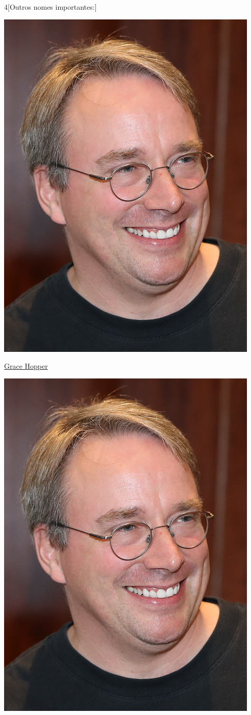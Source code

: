 \begin{multicols}{4}[Outros nomes importantes:]
\begin{center}
					\includegraphics[width=.8\columnwidth]{./IMG-GIT/CIENTISTAS/linus.jpeg}
\end{center}
				
\vfill\null
\columnbreak				
				
				\href{https://pt.wikipedia.org/wiki/Grace_Hopper}{Grace Hopper}
				
\begin{center}
					\includegraphics[width=.8\columnwidth]{./IMG-GIT/CIENTISTAS/linus.jpeg}
\end{center}
				

\end{multicols}
